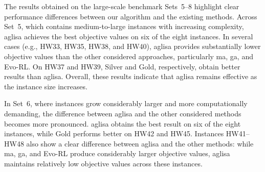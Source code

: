 \documentclass[pdflatex]{sn-jnl}
\begin{document}



The results obtained on the large-scale benchmark Sets~5--8 highlight clear performance differences between our algorithm and the existing methods. Across Set~5, which contains medium-to-large instances with increasing complexity, \gls{aglisa} achieves the best objective values on six of the eight instances. In several cases (e.g., HW33, HW35, HW38, and HW40), \gls{aglisa} provides substantially lower objective values than the other considered approaches, particularly \gls{ma}, \gls{ga}, and Evo-RL. On HW37 and HW39, Silver and Gold, respectively, obtain better results than \gls{aglisa}. Overall, these results indicate that \gls{aglisa} remains effective as the instance size increases.

In Set~6, where instances grow considerably larger and more computationally demanding, the difference between \gls{aglisa} and the other considered methods becomes more pronounced. \gls{aglisa} obtains the best result on six of the eight instances, while Gold performs better on HW42 and HW45. Instances HW41--HW48 also show a clear difference between \gls{aglisa} and the other methods: while \gls{ma}, \gls{ga}, and Evo-RL produce considerably larger objective values, \gls{aglisa} maintains relatively low objective values across these instances.
\end{document}
